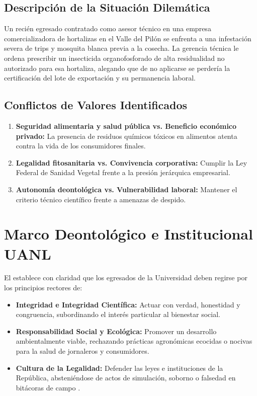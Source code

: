 \documentclass[spanish,letterpaper,oneside]{article}
\begin{document}
\subsection{Descripción de la Situación Dilemática}
Un recién egresado contratado como asesor técnico en una empresa comercializadora de hortalizas en el Valle del Pilón se enfrenta a una infestación severa de trips y mosquita blanca previa a la cosecha. La gerencia técnica le ordena prescribir un insecticida organofosforado de alta residualidad no autorizado para esa hortaliza, alegando que de no aplicarse se perdería la certificación del lote de exportación y su permanencia laboral.
\subsection{Conflictos de Valores Identificados}
\begin{enumerate}
    \item \textbf{Seguridad alimentaria y salud pública vs. Beneficio económico privado:} La presencia de residuos químicos tóxicos en alimentos atenta contra la vida de los consumidores finales.
    \item \textbf{Legalidad fitosanitaria vs. Convivencia corporativa:} Cumplir la Ley Federal de Sanidad Vegetal frente a la presión jerárquica empresarial.
    \item \textbf{Autonomía deontológica vs. Vulnerabilidad laboral:} Mantener el criterio técnico científico frente a amenazas de despido.
\end{enumerate}

\section{Marco Deontológico e Institucional UANL}
El \textcite{uanl_codigo2021} establece con claridad que los egresados de la Universidad deben regirse por los principios rectores de:
\begin{itemize}
    \item \textbf{Integridad e Integridad Científica:} Actuar con verdad, honestidad y congruencia, subordinando el interés particular al bienestar social.
    \item \textbf{Responsabilidad Social y Ecológica:} Promover un desarrollo ambientalmente viable, rechazando prácticas agronómicas ecocidas o nocivas para la salud de jornaleros y consumidores.
    \item \textbf{Cultura de la Legalidad:} Defender las leyes e instituciones de la República, absteniéndose de actos de simulación, soborno o falsedad en bitácoras de campo \parencite{cndh2020}.
\end{itemize}
\end{document}
